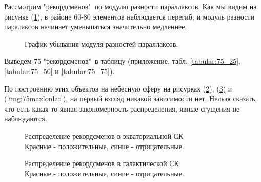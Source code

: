 \documentclass[14pt]{article} %
\begin{document}
Рассмотрим "рекордсменов"\ по модулю разности параллаксов.
Как мы видим на рисунке (\ref{img:abs_paralax}), в районе 60-80 элементов наблюдается перегиб, и модуль разности паралаксов начинает уменьшаться значительно медленнее.

\begin{figure}[h!]
\caption{График убывания модуля разностей параллаксов.}
\label{img:abs_paralax}
\end{figure}

Выведем 75 "рекордсменов"\ в таблицу (приложение, табл. \ref{tabular:75_25}, \ref{tabular:75_50} и \ref{tabular:75_75}).

По построению этих объектов на небесную сферу на рисурках (\ref{img:75maxradec}), (\ref{img:75maxlb}) и (\ref{img:75maxlonlat}), на первый взгляд никакой зависимости нет. Нельзя сказать, что есть какая-то явная  закономерность распределения, явные сгущения не наблюдаются.

\begin{figure}[h!]
\caption{Распределение рекордсменов в экваториальной СК\\Красные - положительные, синие - отрицательные.}
\label{img:75maxradec}
\end{figure}

\begin{figure}[h!]
\caption{Распределение рекордсменов в галактической СК\\Красные - положительные, синие - отрицательные.}
\label{img:75maxlb}
\end{figure}
\end{document}
